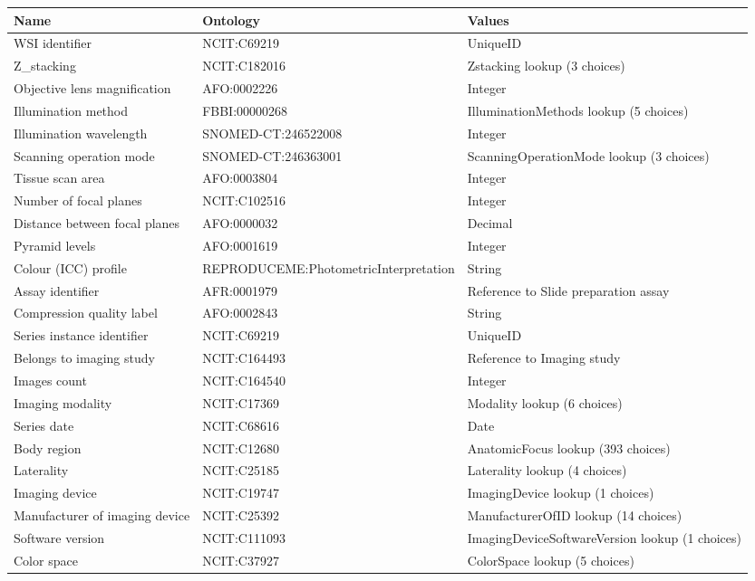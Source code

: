 \documentclass{article}
\begin{document}
\begin{table}[htb]
\begin{tabular}{lll}
Name & Ontology & Values \\
\hline
WSI identifier & NCIT:C69219 & UniqueID \\
Z_stacking & NCIT:C182016 & Zstacking lookup (3 choices) \\
Objective lens magnification & AFO:0002226 & Integer \\
Illumination method & FBBI:00000268 & IlluminationMethods lookup (5 choices) \\
Illumination wavelength & SNOMED-CT:246522008 & Integer \\
Scanning operation mode & SNOMED-CT:246363001 & ScanningOperationMode lookup (3 choices) \\
Tissue scan area & AFO:0003804 & Integer \\
Number of focal planes & NCIT:C102516 & Integer \\
Distance between focal planes & AFO:0000032 & Decimal \\
Pyramid levels & AFO:0001619 & Integer \\
Colour (ICC) profile & REPRODUCEME:PhotometricInterpretation & String \\
Assay identifier & AFR:0001979 & Reference to Slide preparation assay \\
Compression quality label & AFO:0002843 & String \\
Series instance identifier & NCIT:C69219 & UniqueID \\
Belongs to imaging study & NCIT:C164493 & Reference to Imaging study \\
Images count & NCIT:C164540 & Integer \\
Imaging modality & NCIT:C17369 & Modality lookup (6 choices) \\
Series date & NCIT:C68616 & Date \\
Body region & NCIT:C12680 & AnatomicFocus lookup (393 choices) \\
Laterality & NCIT:C25185 & Laterality lookup (4 choices) \\
Imaging device & NCIT:C19747 & ImagingDevice lookup (1 choices) \\
Manufacturer of imaging device & NCIT:C25392 & ManufacturerOfID lookup (14 choices) \\
Software version & NCIT:C111093 & ImagingDeviceSoftwareVersion lookup (1 choices) \\
Color space & NCIT:C37927 & ColorSpace lookup (5 choices) \\

\end{tabular}
\end{table}
\end{document}
